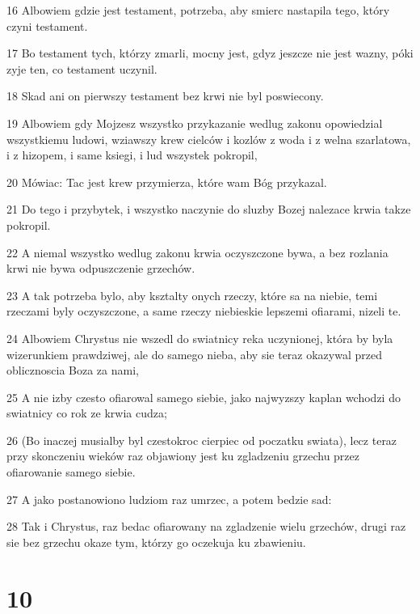 \par 16 Albowiem gdzie jest testament, potrzeba, aby smierc nastapila tego, który czyni testament.
\par 17 Bo testament tych, którzy zmarli, mocny jest, gdyz jeszcze nie jest wazny, póki zyje ten, co testament uczynil.
\par 18 Skad ani on pierwszy testament bez krwi nie byl poswiecony.
\par 19 Albowiem gdy Mojzesz wszystko przykazanie wedlug zakonu opowiedzial wszystkiemu ludowi, wziawszy krew cielców i kozlów z woda i z welna szarlatowa, i z hizopem, i same ksiegi, i lud wszystek pokropil,
\par 20 Mówiac: Tac jest krew przymierza, które wam Bóg przykazal.
\par 21 Do tego i przybytek, i wszystko naczynie do sluzby Bozej nalezace krwia takze pokropil.
\par 22 A niemal wszystko wedlug zakonu krwia oczyszczone bywa, a bez rozlania krwi nie bywa odpuszczenie grzechów.
\par 23 A tak potrzeba bylo, aby ksztalty onych rzeczy, które sa na niebie, temi rzeczami byly oczyszczone, a same rzeczy niebieskie lepszemi ofiarami, nizeli te.
\par 24 Albowiem Chrystus nie wszedl do swiatnicy reka uczynionej, która by byla wizerunkiem prawdziwej, ale do samego nieba, aby sie teraz okazywal przed oblicznoscia Boza za nami,
\par 25 A nie izby czesto ofiarowal samego siebie, jako najwyzszy kaplan wchodzi do swiatnicy co rok ze krwia cudza;
\par 26 (Bo inaczej musialby byl czestokroc cierpiec od poczatku swiata), lecz teraz przy skonczeniu wieków raz objawiony jest ku zgladzeniu grzechu przez ofiarowanie samego siebie.
\par 27 A jako postanowiono ludziom raz umrzec, a potem bedzie sad:
\par 28 Tak i Chrystus, raz bedac ofiarowany na zgladzenie wielu grzechów, drugi raz sie bez grzechu okaze tym, którzy go oczekuja ku zbawieniu.

\chapter{10}

